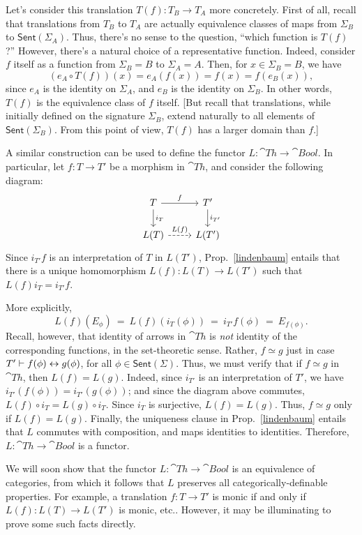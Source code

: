Let's consider this translation $T(f):T_B\to T_A$ more concretely.
First of all, recall that translations from $T_B$ to $T_A$ are
actually equivalence classes of maps from $\Sigma _B$ to
$\mathsf{Sent}(\Sigma _A)$.  Thus, there's no sense to the question,
``which function is $T(f)$?''  However, there's a natural choice of a
representative function.  Indeed, consider $f$ itself as a function
from $\Sigma _B=B$ to $\Sigma _A=A$.  Then, for $x\in\Sigma _B=B$, we
have
\[ (e_A\circ T(f))(x) = e_A(f(x)) = f(x) = f(e_B(x)) ,\] since $e_A$
is the identity on $\Sigma _A$, and $e_B$ is the identity on $\Sigma
_B$.  In other words, $T(f)$ is the equivalence class of $f$ itself.
[But recall that translations, while initially defined on the
signature $\Sigma _B$, extend naturally to all elements of
$\mathsf{Sent}(\Sigma _B)$.  From this point of view, $T(f)$ has a
larger domain than $f$.]

A similar construction can be used to define the functor
$L:\cat{Th}\to \cat{Bool}$.  In particular, let $f:T\to T'$ be a
morphism in $\cat{Th}$, and consider the following diagram:
\[ \begin{tikzcd}
  T \arrow{d}{i_T} \arrow{r}{f} & T' \arrow{d}{i_{T'}} \\
  L(T) \arrow[dashed]{r}{L(f)} & L(T') \end{tikzcd} \] Since $i_{T'}f$
is an interpretation of $T$ in $L(T')$, Prop.\ \ref{lindenbaum}
entails that there is a unique homomorphism $L(f):L(T)\to L(T')$ such
that $L(f)i_T = i_{T'}f$.  

More explicitly,
\[ L(f)(E_\phi ) \: = \: L(f)(i_T(\phi)) \: = \: i_{T'}f(\phi ) \: =
\: E_{f(\phi )} .\] Recall, however, that identity of arrows in
$\cat{Th}$ is \textit{not} identity of the corresponding functions, in
the set-theoretic sense.  Rather, $f\simeq g$ just in case $T'\vdash
f(\phi )\leftrightarrow g(\phi )$, for all $\phi\in\mathsf{Sent}(\Sigma )$.
Thus, we must verify that if $f\simeq g$ in $\cat{Th}$, then
$L(f)=L(g)$.  Indeed, since $i_{T'}$ is an interpretation of $T'$, we
have $i_{T'}(f(\phi ))=i_{T'}(g(\phi ))$; and since the diagram above
commutes, $L(f)\circ i_T=L(g)\circ i_T$.  Since $i_T$ is surjective,
$L(f)=L(g)$.  Thus, $f\simeq g$ only if $L(f)=L(g)$.  Finally, the
uniqueness clause in Prop.\ \ref{lindenbaum} entails that $L$ commutes
with composition, and maps identities to identities.  Therefore,
$L:\cat{Th}\to\cat{Bool}$ is a functor.

We will soon show that the functor $L:\cat{Th}\to\cat{Bool}$ is an
equivalence of categories, from which it follows that $L$ preserves
all categorically-definable properties.  For example, a translation
$f:T\to T'$ is monic if and only if $L(f):L(T)\to L(T')$ is monic,
etc..  However, it may be illuminating to prove some such facts
directly.

